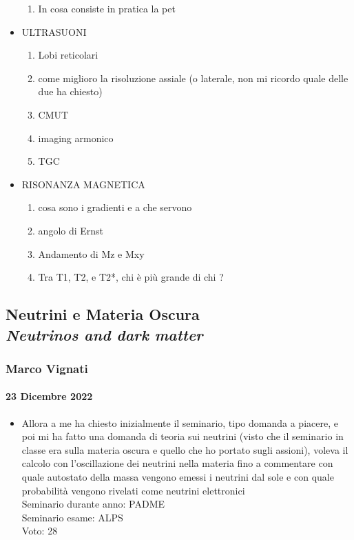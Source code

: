 \documentclass[../main.tex]{subfiles}
\begin{document}
\begin{itemize}
\begin{enumerate}
        \item In cosa consiste in pratica la pet 
    \end{enumerate}
    \item ULTRASUONI
    \begin{enumerate}
        \item  Lobi reticolari 
        \item come miglioro la risoluzione assiale (o laterale, non mi ricordo quale delle due ha chiesto)
        \item CMUT
\item imaging armonico
\item TGC
\end{enumerate}
\item RISONANZA MAGNETICA
\begin{enumerate}
\item cosa sono i gradienti e a che servono
\item angolo di Ernst
\item Andamento di Mz e Mxy 
\item Tra T1, T2, e T2*, chi è più grande di chi ?
\end{enumerate}
\end{itemize}
\newpage
\subsection{Neutrini e Materia Oscura\\
\textit{Neutrinos and dark matter}}
\subsubsection{Marco Vignati}
\paragraph{23 Dicembre 2022}
\begin{itemize}
    \item Allora a me ha chiesto inizialmente il seminario, tipo domanda a piacere, e poi mi ha fatto una domanda di teoria sui neutrini (visto che il seminario in classe era sulla materia oscura e quello che ho portato sugli assioni), voleva il calcolo con l'oscillazione dei neutrini nella materia fino a commentare con quale autostato della massa vengono emessi i neutrini dal sole e con quale probabilità vengono rivelati come neutrini elettronici\\
    Seminario durante anno: PADME\\
    Seminario esame: ALPS\\
    Voto: 28
\end{itemize}
\newpage
\end{document}
